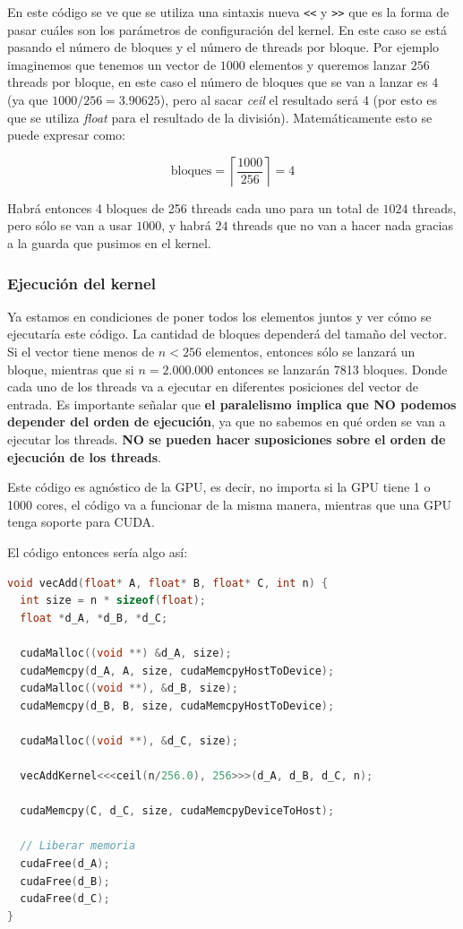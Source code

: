 En este código se ve que se utiliza una sintaxis nueva \texttt{<<} y \texttt{>>} que es la forma de pasar cuáles son los
parámetros de configuración del kernel. En este caso se está pasando el número de bloques y el número de threads por
bloque. Por ejemplo imaginemos que tenemos un vector de $1000$ elementos y queremos lanzar $256$ threads por bloque, en
este caso el número de bloques que se van a lanzar es $4$ (ya que $1000 / 256 = 3.90625$), pero al sacar \textit{ceil}
el resultado será $4$ (por esto es que se utiliza \textit{float} para el resultado de la división). Matemáticamente esto
se puede expresar como:

\[
  \text{bloques} = \left \lceil \frac{1000}{256} \right \rceil = 4
\]

Habrá entonces 4 bloques de 256 threads cada uno para un total de $1024$ threads, pero sólo se van a usar $1000$, y
habrá $24$ threads que no van a hacer nada gracias a la guarda que pusimos en el kernel.

\subsubsection{Ejecución del kernel}

Ya estamos en condiciones de poner todos los elementos juntos y ver cómo se ejecutaría este código. La cantidad de
bloques dependerá del tamaño del vector. Si el vector tiene menos de $n < 256$ elementos, entonces sólo se lanzará un
bloque, mientras que si $n = 2.000.000$ entonces se lanzarán 7813 bloques. Donde cada uno de los threads va a ejecutar
en diferentes posiciones del vector de entrada. Es importante señalar que \textbf{el paralelismo implica que NO podemos
depender del orden de ejecución}, ya que no sabemos en qué orden se van a ejecutar los threads. \textbf{NO se pueden
hacer suposiciones sobre el orden de ejecución de los threads}.

Este código es agnóstico de la GPU, es decir, no importa si la GPU tiene 1 o 1000 cores, el código va a funcionar de la
misma manera, mientras que una GPU tenga soporte para CUDA.

El código entonces sería algo así:

\begin{lstlisting}[language=C]
void vecAdd(float* A, float* B, float* C, int n) {
  int size = n * sizeof(float);
  float *d_A, *d_B, *d_C;

  cudaMalloc((void **) &d_A, size);
  cudaMemcpy(d_A, A, size, cudaMemcpyHostToDevice);
  cudaMalloc((void **), &d_B, size);
  cudaMemcpy(d_B, B, size, cudaMemcpyHostToDevice);

  cudaMalloc((void **), &d_C, size);

  vecAddKernel<<<ceil(n/256.0), 256>>>(d_A, d_B, d_C, n);

  cudaMemcpy(C, d_C, size, cudaMemcpyDeviceToHost);

  // Liberar memoria
  cudaFree(d_A);
  cudaFree(d_B);
  cudaFree(d_C);
}
\end{lstlisting}

